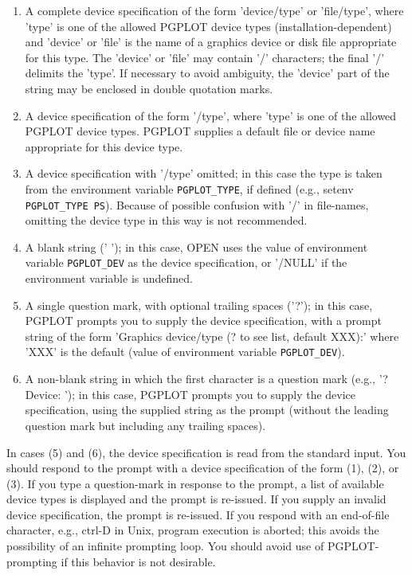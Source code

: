 \begin{enumerate}
\item A complete device specification of the form 'device/type' or
      'file/type', where 'type' is one of the allowed PGPLOT device
      types (installation-dependent) and 'device' or 'file' is the
      name of a graphics device or disk file appropriate for this
      type.  The 'device' or 'file' may contain '/' characters; the
      final '/' delimits the 'type'.  If necessary to avoid ambiguity,
      the 'device' part of the string may be enclosed in double
      quotation marks.
\item A device specification of the form '/type', where 'type' is one
      of the allowed PGPLOT device types.  PGPLOT supplies a default
      file or device name appropriate for this device type.
\item A device specification with '/type' omitted; in this case the
      type is taken from the environment variable {\tt PGPLOT\_TYPE},
      if defined (e.g., setenv {\tt PGPLOT\_TYPE PS}).  Because of
      possible confusion with '/' in file-names, omitting the device
      type in this way is not recommended.
\item A blank string (' '); in this case, OPEN uses the value
      of environment variable {\tt PGPLOT\_DEV} as the device
      specification, or '/NULL' if the environment variable is
      undefined.
\item A single question mark, with optional trailing spaces ('?'); in
      this case, PGPLOT prompts you to supply the device
      specification, with a prompt string of the form 'Graphics
      device/type (? to see list, default XXX):' where 'XXX' is the
      default (value of environment variable {\tt PGPLOT\_DEV}). 
\item A non-blank string in which the first character is a question
      mark (e.g., '?Device: '); in this case, PGPLOT prompts you
      to supply the device specification, using the supplied
      string as the prompt (without the leading question mark but
      including any trailing spaces). 
\end{enumerate}

In cases (5) and (6), the device specification is read from the
standard input.  You should respond to the prompt with a device
specification of the form (1), (2), or (3).  If you type a
question-mark in response to the prompt, a list of available device
types is displayed and the prompt is re-issued.  If you supply
an invalid device specification, the prompt is re-issued.  If you
respond with an end-of-file character, e.g., ctrl-D in {\sc Unix}, program
execution is aborted; this avoids the possibility of an infinite
prompting loop.  You should avoid use of PGPLOT-prompting if
this behavior is not desirable.

